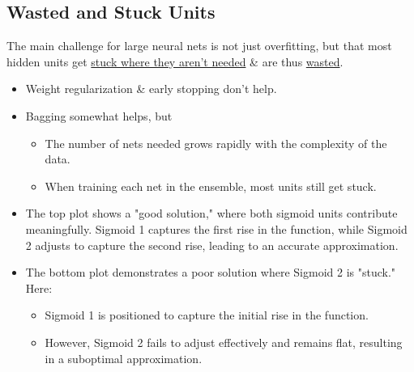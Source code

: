 \subsection{Wasted and Stuck Units}
\begin{summary}
    The main challenge for large neural nets is not just overfitting, but that most hidden units get \underline{stuck where they aren't needed} \& are thus \underline{wasted}.
    \vspace{1em}
    
    \begin{itemize}
        \item Weight regularization \& early stopping don't help.
        \item Bagging somewhat helps, but
        \begin{itemize}
            \item The number of nets needed grows rapidly with the complexity of the data.
            \item When training each net in the ensemble, most units still get stuck.
        \end{itemize}
    \end{itemize}
\end{summary}

\begin{example}
    \begin{itemize}
        \item The top plot shows a "good solution," where both sigmoid units contribute meaningfully. Sigmoid 1 captures the first rise in the function, while Sigmoid 2 adjusts to capture the second rise, leading to an accurate approximation.
        
        \item The bottom plot demonstrates a poor solution where Sigmoid 2 is "stuck." Here:
            \begin{itemize}
                \item Sigmoid 1 is positioned to capture the initial rise in the function.
                \item However, Sigmoid 2 fails to adjust effectively and remains flat, resulting in a suboptimal approximation.
            \end{itemize}
    \end{itemize}    
\end{example}

